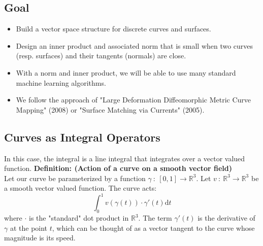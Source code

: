 \documentclass[10pt]{article}
\newcommand{\R}{\mathbb{R}}
\begin{document}
\subsection*{Goal}
\begin{itemize}
    \item Build a vector space structure for discrete curves and surfaces.
    \item Design an inner product and associated norm that is small when two curves (resp. surfaces) and their tangents (normals) are close.
    \item With a norm and inner product, we will be able to use many standard machine learning algorithms.
    \item We follow the approach of "Large Deformation Diffeomorphic Metric Curve Mapping" (2008) or "Surface Matching via Currents" (2005).
\end{itemize}

\subsection*{Curves as Integral Operators}
In this case, the integral is a line integral that integrates over a vector valued function.
\textbf{Definition: (Action of a curve on a smooth vector field)}\\
Let our curve be parameterized by a function $\gamma \::\: [0, 1] \rightarrow \mathbb{R}^3$.  Let $v \::\: \R^3 \rightarrow \R^3$ be a smooth vector valued function.  The curve acts:
\[\int_0^1 v(\gamma(t)) \cdot \gamma'(t) \text{d} t\]
where $\cdot$ is the "standard" dot product in $\R^3$.  The term $\gamma'(t)$ is the derivative of $\gamma$ at the point $t$, which can be thought of as a vector tangent to the curve whose magnitude is its speed.

\pagebreak
\end{document}
